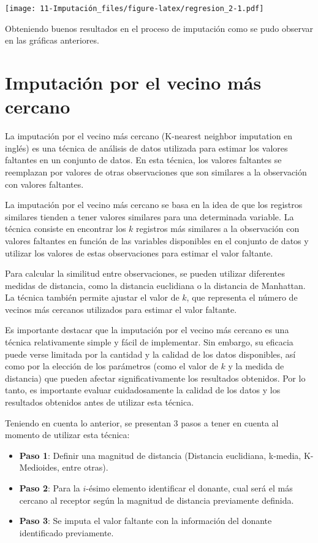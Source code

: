 \documentclass[
  12pt,
]{book}
\providecommand{\tightlist}{%
  \setlength{\itemsep}{0pt}\setlength{\parskip}{0pt}}
\begin{document}
\texttt{[image: 11-Imputación\_files/figure-latex/regresion\_2-1.pdf]}

Obteniendo buenos resultados en el proceso de imputación como se pudo observar en las gráficas anteriores.

\hypertarget{imputaciuxf3n-por-el-vecino-muxe1s-cercano}{%
\section{Imputación por el vecino más cercano}\label{imputaciuxf3n-por-el-vecino-muxe1s-cercano}}

La imputación por el vecino más cercano (K-nearest neighbor imputation en inglés) es una técnica de análisis de datos utilizada para estimar los valores faltantes en un conjunto de datos. En esta técnica, los valores faltantes se reemplazan por valores de otras observaciones que son similares a la observación con valores faltantes.

La imputación por el vecino más cercano se basa en la idea de que los registros similares tienden a tener valores similares para una determinada variable. La técnica consiste en encontrar los \(k\) registros más similares a la observación con valores faltantes en función de las variables disponibles en el conjunto de datos y utilizar los valores de estas observaciones para estimar el valor faltante.

Para calcular la similitud entre observaciones, se pueden utilizar diferentes medidas de distancia, como la distancia euclidiana o la distancia de Manhattan. La técnica también permite ajustar el valor de \(k\), que representa el número de vecinos más cercanos utilizados para estimar el valor faltante.

Es importante destacar que la imputación por el vecino más cercano es una técnica relativamente simple y fácil de implementar. Sin embargo, su eficacia puede verse limitada por la cantidad y la calidad de los datos disponibles, así como por la elección de los parámetros (como el valor de \(k\) y la medida de distancia) que pueden afectar significativamente los resultados obtenidos. Por lo tanto, es importante evaluar cuidadosamente la calidad de los datos y los resultados obtenidos antes de utilizar esta técnica.

Teniendo en cuenta lo anterior, se presentan 3 pasos a tener en cuenta al momento de utilizar esta técnica:

\begin{itemize}
\tightlist
\item
  \textbf{Paso 1}: Definir una magnitud de distancia (Distancia euclidiana,
  k-media, K-Medioides, entre otras).
\item
  \textbf{Paso 2}: Para la \(i\)-ésimo elemento identificar el donante, cual será el
  más cercano al receptor según la magnitud de distancia previamente definida.
\item
  \textbf{Paso 3}: Se imputa el valor faltante con la información del donante
  identificado previamente.
\end{itemize}
\end{document}
